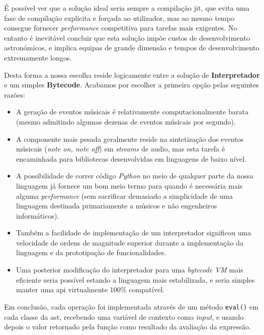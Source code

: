  É possível ver que a solução ideal seria sempre a compilação \acrfull{jit}, que evita uma fase de compilação explícita e forçada ao utilizador, mas ao mesmo tempo consegue fornecer \textit{performance} competitiva para tarefas mais exigentes. No entanto é inevitável concluir que esta solução impõe custos de desenvolvimento astronómicos, e implica equipas de grande dimensão e tempos de desenvolvimento extremamente longos.
 
 Desta forma a nossa escolha reside logicamente entre a solução de \textbf{Interpretador} e um simples \textbf{Bytecode}. Acabamos por escolher a primeira opção pelas seguintes razões:
 \begin{itemize}
  \item A geração de eventos músicais é relativamente computacionalmente barata (mesmo admitindo algumas dezenas de eventos músicais por segundo).
  \item A componente mais pesada geralmente reside na sintetização dos eventos músicais (\textit{note on, note off}) em \textit{streams} de audio, mas esta tarefa é encaminhada para bibliotecas desenvolvidas em linguagens de baixo nível.
  \item A possibilidade de correr código \textit{Python} no meio de qualquer parte da nossa linguagem já fornece um bom meio termo para quando é necessária mais alguma \textit{performance} (sem sacrificar demasiado a simplicidade de uma linguagem destinada primariamente a músicos e não engenheiros informáticos).
  \item Também a facilidade de implementação de um interpretador significou uma velocidade de ordens de magnitude superior durante a implementação da linguagem e da prototipação de funcionalidades.
  \item Uma posterior modificação do interpretador para uma \textit{bytecode VM} mais eficiente seria possível estando a linguagem mais estabilizada, e seria simples manter uma \acrshort{api} virtualmente 100\% compatível.
 \end{itemize}

 Em conclusão, cada operação foi implementada através de um método \texttt{eval()} em cada classe da \acrshort{ast}, recebendo uma variável de contexto como \textit{input}, e usando depois o valor retornado pela função como resultado da avaliação da expressão.
 

